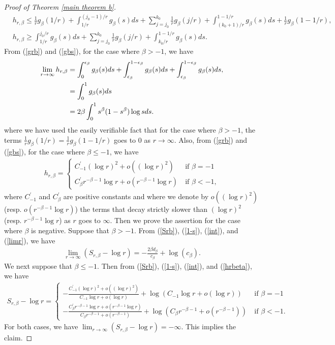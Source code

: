 \documentclass[12pt]{article}
\theoremstyle{definition}
\begin{document}
\begin{proof}[Proof of Theorem \ref{main theorem b}]
\begin{align}
&h_{r,\beta}\leq \frac{1}{r}g_\beta(1/r)+\int_{1/r}^{(j_0-1)/r}g_\beta(s)ds+\sum_{j=j_0}^{k_0}\frac{1}{r}g_\beta(j/r)+\int_{(k_0+1)/r}^{1-1/r}g_\beta(s)ds+\frac{1}{r}g_\beta(1-1/r), \label{grb}\\
&h_{r,\beta}\geq \int_{1/r}^{j_0/r}g_\beta(s)ds+\sum_{j=j_0}^{k_0}\frac{1}{r}g_\beta(j/r)+\int_{k_0/r}^{1-1/r}g_\beta(s)ds. \label{gbs}
\end{align}
From (\ref{grb}) and (\ref{gbs}), for the case where $\beta>-1$, we have
\begin{align}
\lim_{r\to\infty} h_{r,\beta}&=\int_0^{\epsilon_\beta} g_\beta(s)ds+\int_{\epsilon_\beta}^{1-\epsilon_\beta}g_\beta(s)ds +\int_{\epsilon_\beta}^{1-\epsilon_\beta}g_\beta(s)ds, \notag \\
&=\int_0^1g_\beta(s)ds \noindent \\
&=2\beta\int_0^1s^\beta(1-s^\beta)\log sds.\label{limr}
\end{align}
where we have used the easily verifiable fact that for the case where $\beta>-1$, the terms $\frac{1}{r}g_\beta(1/r)=\frac{1}{r}g_\beta(1-1/r)$ goes to $0$ as $r\to\infty$.
Also, from (\ref{grb}) and (\ref{gbs}), for the case where $\beta\leq -1$, we have
\begin{align}
h_{r,\beta}=\begin{cases}
C_{-1}^\prime(\log r)^2+o((\log r)^2) \ &\text{if $\beta=-1$}\\
C_\beta^\prime r^{-\beta-1}\log r+o(r^{-\beta-1}\log r) \ &\text{if $\beta< -1$},
\end{cases} \label{hrbeta}
\end{align}
where $C^\prime_{-1}$ and $C_\beta^\prime$ are positive constants and where we denote by $o((\log r)^2)$ (resp. $o(r^{-\beta-1}\log r)$) the terms that decay strictly slower than $(\log r)^2$ (resp. $r^{-\beta-1}\log r$) as $r$ goes to $\infty$.
Then we prove the assertion for the case where $\beta$ is negative. Suppose that $\beta>-1$. From (\ref{Srb}), (\ref{1-s}), (\ref{int}), and (\ref{limr}), we have 
\begin{align*}
\lim_{r\to\infty} (S_{r,\beta}-\log r)=-\frac{2\beta d_\beta}{c_\beta}+\log(c_\beta).
\end{align*}
We next suppose that $\beta\leq -1$. Then from (\ref{Srb}), (\ref{1-s}), (\ref{int}), and (\ref{hrbeta}), we have
\begin{align*}
S_{r,\beta}-\log r=
\begin{cases}
-\frac{C_{-1}^\prime(\log r)^2+o((\log r)^2)}{C_{-1}\log r+o(\log r)}+\log\left(C_{-1}\log r+o(\log r)\right) \ &\text{if $\beta=-1$}\\
-\frac{C_\beta^\prime r^{-\beta-1}\log r+o(r^{-\beta-1}\log r)}{C_\beta r^{-\beta-1}+o(r^{-\beta-1})}+\log\left(C_\beta r^{-\beta-1}+o(r^{-\beta-1})\right) \ &\text{if $\beta< -1$}.
\end{cases}
\end{align*}
For both cases, we have $\lim_{r\to\infty}(S_{r,\beta}-\log r)=-\infty$. This implies the claim.
\end{proof}
\end{document}
